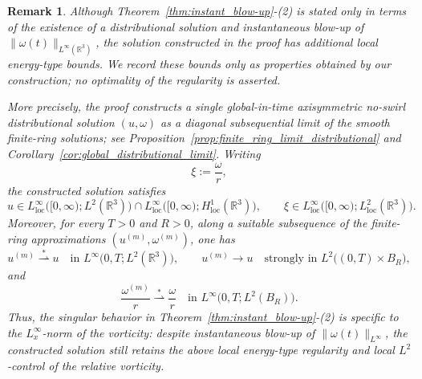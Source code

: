 \documentclass[reqno,11pt]{amsart}
\newtheorem{remark}{Remark}[section]
\begin{document}
\begin{remark}
Although Theorem~\ref{thm:instant_blow-up}-(2) is stated only in terms of the
existence of a distributional solution and instantaneous blow-up of
\(\|\omega(t)\|_{L^\infty(\mathbb{R}^3)}\), the solution constructed in the proof
has additional local energy-type bounds. We record these bounds
only as properties obtained by our construction; no optimality of the regularity
is asserted.

More precisely, the proof constructs a single global-in-time axisymmetric
no-swirl distributional solution \((u,\omega)\) as a diagonal subsequential limit
of the smooth finite-ring solutions; see
Proposition~\ref{prop:finite_ring_limit_distributional} and
Corollary~\ref{cor:global_distributional_limit}. Writing
\[
\xi:=\frac{\omega}{r},
\]
the constructed solution satisfies
\[
u\in L^\infty_{\mathrm{loc}}\bigl([0,\infty);L^2(\mathbb{R}^3)\bigr)
\cap L^\infty_{\mathrm{loc}}\bigl([0,\infty);H^1_{\mathrm{loc}}(\mathbb{R}^3)\bigr),
\qquad
\xi\in L^\infty_{\mathrm{loc}}\bigl([0,\infty);L^2_{\mathrm{loc}}(\mathbb{R}^3)\bigr).
\]
Moreover, for every \(T>0\) and \(R>0\), along a suitable subsequence of the finite-ring
approximations \((u^{(m)},\omega^{(m)})\), one has
\[
u^{(m)} \overset{*}{\rightharpoonup} u
\quad\text{in }L^\infty\bigl(0,T;L^2(\mathbb{R}^3)\bigr),
\qquad
u^{(m)} \to u
\quad\text{strongly in }L^2\bigl((0,T)\times B_R\bigr),
\]
and
\[
\frac{\omega^{(m)}}{r}
\overset{*}{\rightharpoonup}
\frac{\omega}{r}
\quad\text{in }L^\infty\bigl(0,T;L^2(B_R)\bigr).
\]
Thus, the singular behavior in Theorem~\ref{thm:instant_blow-up}-(2) is specific to the
\(L^\infty_x\)-norm of the vorticity: despite instantaneous blow-up of
\(\|\omega(t)\|_{L^\infty}\), the constructed solution still retains the above local
energy-type regularity and local \(L^2\)-control of the relative vorticity. 
\end{remark}
\end{document}
